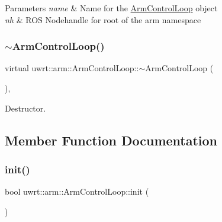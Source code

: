 \begin{DoxyParams}{Parameters}
{\em name} & Name for the \hyperlink{classuwrt_1_1arm_1_1_arm_control_loop}{Arm\+Control\+Loop} object \\
\hline
{\em nh} & R\+OS Nodehandle for root of the arm namespace \\
\hline
\end{DoxyParams}
\mbox{\label{classuwrt_1_1arm_1_1_arm_control_loop_a35e34c53f7a7d42bc430e1b8a26328ee}} 
\subsubsection{\texorpdfstring{$\sim$\+Arm\+Control\+Loop()}{~ArmControlLoop()}}
{\footnotesize\ttfamily virtual uwrt\+::arm\+::\+Arm\+Control\+Loop\+::$\sim$\+Arm\+Control\+Loop (\begin{DoxyParamCaption}{ }\end{DoxyParamCaption})\hspace{0.3cm}{\ttfamily [virtual]}, {\ttfamily [default]}}



Destructor. 



\subsection{Member Function Documentation}
\mbox{\label{classuwrt_1_1arm_1_1_arm_control_loop_a40fbe9c3e41bd01174c61aca2faec58b}} 
\subsubsection{\texorpdfstring{init()}{init()}}
{\footnotesize\ttfamily bool uwrt\+::arm\+::\+Arm\+Control\+Loop\+::init (\begin{DoxyParamCaption}{ }\end{DoxyParamCaption})\hspace{0.3cm}{\ttfamily [virtual]}}




